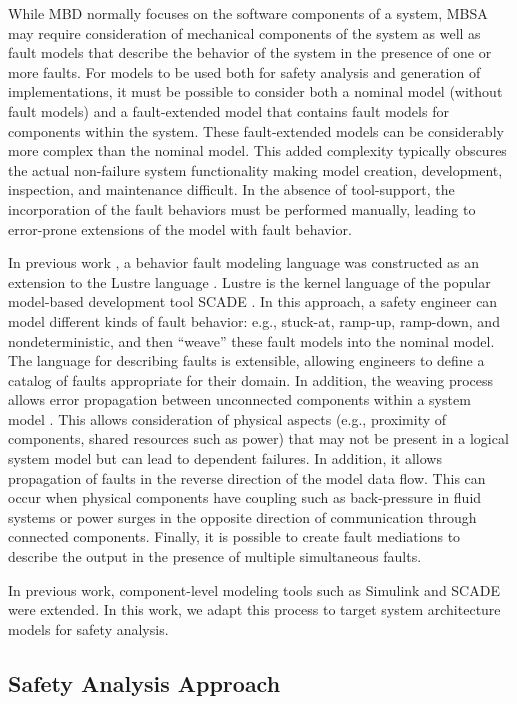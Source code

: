 While MBD normally focuses on the software components of a system, MBSA may require consideration of mechanical components of the system as well as fault models that describe the behavior of the system in the presence of one or more faults. For models to be used both for safety analysis and generation of implementations, it must be possible to consider both a nominal model (without fault models) and a fault-extended model that contains fault models for components within the system. These fault-extended models can be considerably more complex than the nominal model. This added complexity typically obscures the actual non-failure system functionality making model creation, development, inspection, and maintenance difficult. In the absence of tool-support, the incorporation of the fault behaviors must be performed manually, leading to error-prone extensions of the model with fault behavior.

In previous work \cite{Joshi05:SafeComp}, a behavior fault modeling language was constructed as an extension to the Lustre language \cite{Halbwachs91:IEEE}. Lustre is the kernel language of the popular model-based development tool SCADE \cite{SCADE}. In this approach, a safety engineer can model different kinds of fault behavior: e.g., stuck-at, ramp-up, ramp-down, and nondeterministic, and then \enquote{weave} these fault models into the nominal model. The language for describing faults is extensible, allowing engineers to define a catalog of faults appropriate for their domain. In addition, the weaving process allows error propagation between unconnected components within a system model \cite{Joshi07:Hase}. This allows consideration of physical aspects (e.g., proximity of components, shared resources such as power) that may not be present in a logical system model but can lead to dependent failures. In addition, it allows propagation of faults in the reverse direction of the model data flow. This can occur when physical components have coupling such as back-pressure in fluid systems or power surges in the opposite direction of communication through connected components. Finally, it is possible to create fault mediations to describe the output in the presence of multiple simultaneous faults.

In previous work, component-level modeling tools such as Simulink \cite{MathWorks} and SCADE \cite{SCADE} were extended. In this work, we adapt this process to target system architecture models \cite{AADL, SysML} for safety analysis.

\subsection{Safety Analysis Approach}

